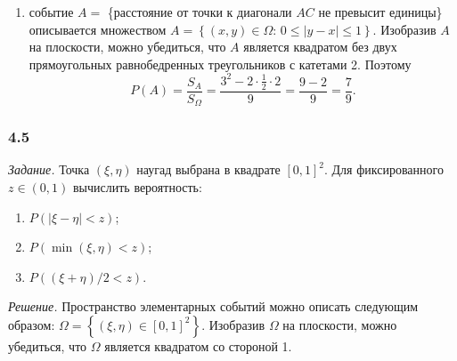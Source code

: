 \begin{enumerate}[label=\alph*)]
\item событие $A =$
\{расстояние от точки к диагонали $AC$ не превысит единицы\}
описывается множеством $A = \left\{ \left( x, y \right) \in \Omega: \, 0 \leq \left| y - x \right| \leq 1 \right\}$.
Изобразив $A$ на плоскости, можно убедиться,
что $A$ является квадратом без двух прямоугольных равнобедренных треугольников с катетами 2.
Поэтому
$$P \left( A \right) =
\frac{S_A}{S_{ \Omega }} =
\frac{3^2 - 2 \cdot \frac{1}{2} \cdot 2}{9} =
\frac{9 - 2}{9} =
\frac{7}{9}.$$
\end{enumerate}

\subsubsection*{4.5}

\textit{Задание.} Точка $ \left( \xi, \eta \right) $ наугад выбрана в квадрате $ \left[ 0, 1 \right]^2$.
Для фиксированного $z \in \left( 0, 1 \right) $ вычислить вероятность:
\begin{enumerate}[label=\alph*)]
\item $P \left( \left| \xi - \eta \right| < z \right) $;
\item $P \left( \min \left( \xi, \eta \right) < z \right) $;
\item $P \left( \left( \xi + \eta \right)/2 < z \right) $.
\end{enumerate}

\textit{Решение.}
Пространство элементарных событий можно описать следующим образом:
$ \Omega =
\left\{ \left( \xi, \eta \right) \in \left[ 0, 1 \right]^2 \right\} $.
Изобразив $ \Omega $ на плоскости, можно убедиться, что $ \Omega $ является квадратом со стороной 1.

